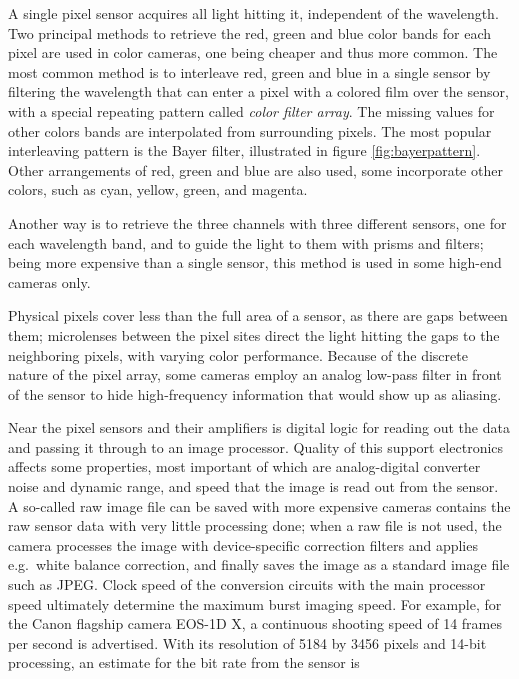 
A single pixel sensor acquires all light hitting it, independent of the wavelength.
Two principal methods to retrieve the red, green and blue color bands for each pixel are used in color cameras, one being cheaper and thus more common.
The most common method is to interleave red, green and blue in a single sensor by filtering the wavelength that can enter a pixel with a colored film over the sensor, with a special repeating pattern called \emph{color filter array}.
The missing values for other colors bands are interpolated from surrounding pixels.
The most popular interleaving pattern is the Bayer filter, illustrated in figure \ref{fig:bayerpattern}.
Other arrangements of red, green and blue are also used, some incorporate other colors, such as cyan, yellow, green, and magenta.

Another way is to retrieve the three channels with three different sensors, one for each wavelength band, and to guide the light to them with prisms and filters; being more expensive than a single sensor, this method is used in some high-end cameras only.



Physical pixels cover less than the full area of a sensor, as there are gaps between them;
microlenses between the pixel sites direct the light hitting the gaps to the neighboring pixels, with varying color performance.
Because of the discrete nature of the pixel array, some cameras employ an analog low-pass filter in front of the sensor to hide high-frequency information that would show up as aliasing.


Near the pixel sensors and their amplifiers is digital logic for reading out the data and passing it through to an image processor.
Quality of this support electronics affects some properties, most important of which are analog-digital converter noise and dynamic range, and speed that the image is read out from the sensor.
A so-called raw image file can be saved with more expensive cameras contains the raw sensor data with very little processing done;
when a raw file is not used, the camera processes the image with device-specific correction filters and applies e.g.~white balance correction, and finally saves the image as a standard image file such as JPEG.
Clock speed of the conversion circuits with the main processor speed ultimately determine the maximum burst imaging speed.
For example, for the Canon flagship camera EOS-1D X, a continuous shooting speed of 14 frames per second is advertised.
With its resolution of 5184 by 3456 pixels and 14-bit processing, an estimate for the bit rate from the sensor is

